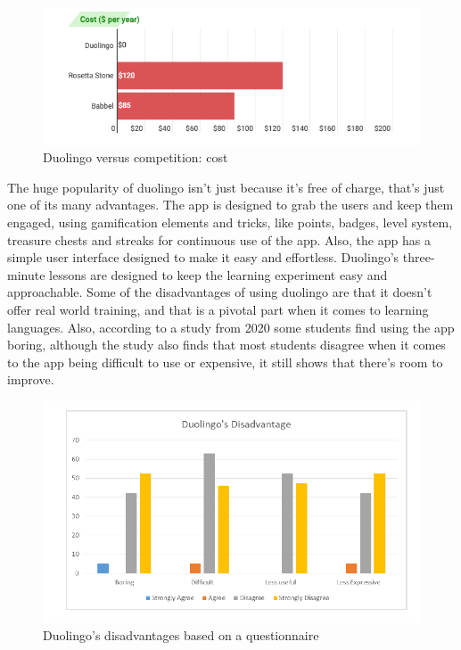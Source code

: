 \documentclass[../main.tex]{subfiles}
\begin{document}
\begin{figure}[!ht]
\centering
\includegraphics[scale=0.7]{images/chapter2/image9.png}
\caption{Duolingo versus competition: cost }
\label{Duolingo versus competition: cost }
\end{figure}

The huge popularity of duolingo isn’t just because it’s free of charge, that’s just one of its many advantages. The app is designed to grab the users and keep them engaged, using gamification elements and tricks, like points, badges, level system, treasure chests and streaks for continuous use of the app. Also, the app has a simple user interface designed to make it easy and effortless.
\newpage 
Duolingo’s three-minute lessons are designed to keep the learning experiment easy and approachable. Some of the disadvantages of using duolingo are that it doesn’t offer real world training, and that is a pivotal part when it comes to learning languages. Also, according to a study from 2020 some students find using the app boring, although the study also finds that most students disagree when it comes to the app being difficult to use or expensive, it still shows that there’s room to improve. \cite{28}\cite{29}

\begin{figure}[!ht]
\centering
\includegraphics[scale=0.5]{images/chapter2/image21.png}
\caption{ Duolingo’s disadvantages based on a questionnaire}
\label{ Duolingo’s disadvantages based on a questionnaire }
\end{figure}
\newpage
\end{document}

